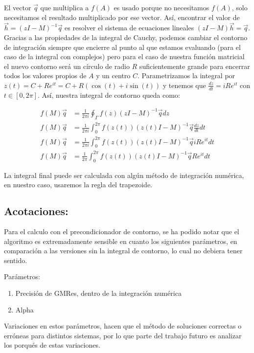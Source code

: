 \documentclass[fleqn]{article}
\begin{document}
El vector $\vec{q}$ que multiplica a $f(A)$ es usado porque no necesitamos $f(A)$, solo necesitamos el resultado multiplicado por ese vector. Así, encontrar el valor de $\vec{h} = (zI - M)^{-1}\vec{q}$ es resolver el sistema de ecuaciones lineales $(zI - M)\vec{h} = \vec{q}$. Gracias a las propiedades de la integral de Cauchy, podemos cambiar el contorno de integración siempre que encierre al punto al que estamos evaluando (para el caso de la integral con complejos) pero para el caso de nuestra función matricial el nuevo contorno será un círculo de radio $R$ suficientemente grande para encerrar todos los valores propios de $A$ y un centro $C$. Parametrizamos la integral por $z(t) = C + Re^{it} = C + R(\cos(t) + i\sin(t))$ y tenemos que $\frac{dz}{dt} = iRe^{it}$ con $t \in [0,2\pi]$. Así, nuestra integral de contorno queda como:

\begin{align*}
    f(M)\vec{q} &= \frac{1}{2\pi i} \oint_{\Gamma} f(z)(zI - M)^{-1}\vec{q}dz \\
    f(M)\vec{q} &= \frac{1}{2\pi i} \int_{0}^{2\pi} f(z(t))(z(t)I - M)^{-1}\vec{q}\frac{dz}{dt}dt \\
    f(M)\vec{q} &= \frac{1}{2\pi i} \int_{0}^{2\pi} f(z(t))(z(t)I - M)^{-1}\vec{q}iRe^{it}dt \\
    f(M)\vec{q} &= \frac{1}{2\pi} \int_{0}^{2\pi} f(z(t))(z(t)I - M)^{-1}\vec{q}Re^{it}dt
\end{align*}

La integral final puede ser calculada con algún método de integración numérica, en nuestro caso, usaremos la regla del trapezoide.


\subsection{Acotaciones:}
Para el calculo con el precondicionador de contorno, se ha podido notar que el algoritmo es extremadamente sensible en cuanto los siguientes parámetros, en comparación a las versiones sin la integral de contorno, lo cual no debiera tener sentido.

Parámetros:
\begin{enumerate}
\item Precisión de GMRes, dentro de la integración numérica
\item Alpha
\end{enumerate}

Variaciones en estos parámetros, hacen que el método de soluciones correctas o erróneas para distintos sistemas, por lo que parte del trabajo futuro es analizar los porqués de estas variaciones.




\end{document}
